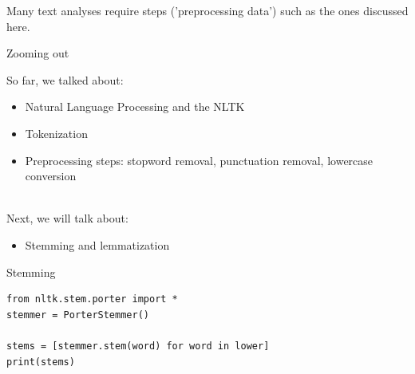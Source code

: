 \documentclass[handout]{beamer}
\begin{document}
\begin{frame}

Many text analyses require steps ('preprocessing data') such as the ones discussed here.

\end{frame}

\begin{frame}{Zooming out} 
	
So far, we talked about:
\begin{itemize}
	\item Natural Language Processing and the NLTK
	\item Tokenization 
	\item Preprocessing steps: stopword removal, punctuation removal, lowercase conversion \\\
\end{itemize}
	
Next, we will talk about:
	\begin{itemize}
		\item Stemming and lemmatization
	\end{itemize}
	
\end{frame}



\begin{frame}[fragile]{Stemming }

\begin{lstlisting}
from nltk.stem.porter import *
stemmer = PorterStemmer()

stems = [stemmer.stem(word) for word in lower]
print(stems)
\end{lstlisting}

\begin{lstlistingoutput}
\end{lstlistingoutput}


\end{frame}
\end{document}
